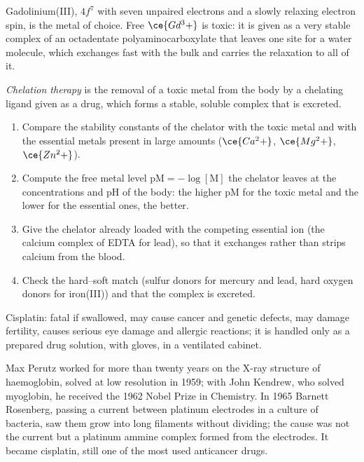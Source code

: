 Gadolinium(III), $4f^7$ with seven unpaired electrons and a slowly relaxing
electron spin, is the metal of choice. Free $\ce{Gd^3+}$ is toxic: it is given as a
very stable complex of an octadentate polyaminocarboxylate that leaves one
site for a water molecule, which exchanges fast with the bulk and carries the
relaxation to all of it.

\begin{definition}\label{def:b3:bioinorganic:chelation-therapy}
\emph{Chelation therapy} is the removal of a toxic
metal from the body by a chelating ligand given as a drug, which forms a stable,
soluble complex that is excreted.
\end{definition}

\begin{method}\label{met:b3:bioinorganic:choose-chelator}
\begin{enumerate}
  \item Compare the stability constants of the chelator with the toxic metal
        and with the essential metals present in large amounts ($\ce{Ca^2+}$, $\ce{Mg^2+}$,
        $\ce{Zn^2+}$).
  \item Compute the free metal level $\mathrm{pM} = -\log[\mathrm M]$ the chelator leaves at the
        concentrations and pH of the body: the higher pM for the toxic metal and the
        lower for the essential ones, the better.
  \item Give the chelator already loaded with the competing essential ion (the
        calcium complex of EDTA for lead), so that it exchanges rather than
        strips calcium from the blood.
  \item Check the hard--soft match (sulfur donors for mercury and lead, hard
        oxygen donors for iron(III)) and that the complex is excreted.
\end{enumerate}
\end{method}

\begin{safety}{}
Cisplatin: fatal if swallowed, may cause cancer and genetic defects, may damage
fertility, causes serious eye damage and allergic reactions; it is handled
only as a prepared drug solution, with gloves, in a ventilated cabinet.
\end{safety}

\begin{history}
Max Perutz worked for more than twenty years on the X-ray structure of
haemoglobin, solved at low resolution in 1959; with John Kendrew, who solved
myoglobin, he received the 1962 Nobel Prize in Chemistry. In 1965 Barnett
Rosenberg, passing a current between platinum electrodes in a culture of
bacteria, saw them grow into long filaments without dividing; the cause was
not the current but a platinum ammine complex formed from the electrodes. It
became cisplatin, still one of the most used anticancer drugs.
\end{history}

